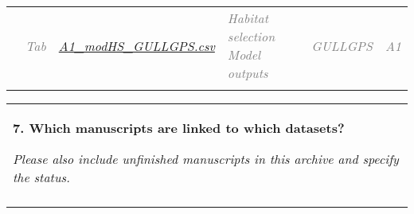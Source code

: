 \documentclass[12pt]{article}
\begin{document}
\begin{table}[H]
\begin{tabular}{p{0.20in}p{}p{2.40in}p{1.50in}p{0.70in}p{0.45in}}
\hhline{-------}
\multicolumn{1}{|p{0.20in}}{\textit{\textcolor[HTML]{808080}{R4}}} & %
\multicolumn{1}{|p{0.30in}}{\textit{\textcolor[HTML]{808080}{Tab}}} & %
\multicolumn{1}{|p{2.40in}|}{\textit{\textcolor[HTML]{808080}{\href{MANUSCRIPTS/MS1/RESULTS/.}{A1\_modHS\_GULLGPS.csv}}}} & %
\multicolumn{1}{|p{1.50in}|}{\textit{\textcolor[HTML]{808080}{Habitat selection Model outputs}}} & %
\multicolumn{1}{|p{0.70in}|}{\textit{\textcolor[HTML]{808080}{GULLGPS}}} & %
\multicolumn{1}{|p{0.40in}|}{\textit{\textcolor[HTML]{808080}{A1}}} \\ %
\hhline{-------}
\end{tabular}
\end{table}



\newpage




\begin{table}[H]
 			\centering
\begin{tabular}{p{5.99in}}
\hline
\multicolumn{1}{|p{5.99in}|}{\textbf{7. Which manuscripts are linked to which datasets?}
\par \textit{{Please also include unfinished manuscripts in this archive and specify the status.}}} \\
\hhline{-}
\end{tabular}
\end{table}

\end{document}
